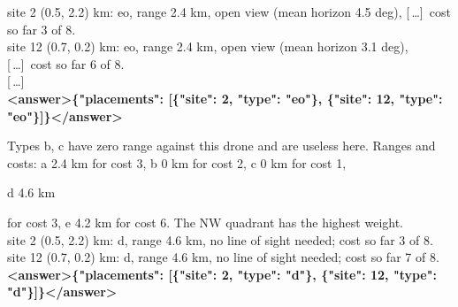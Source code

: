 \documentclass[border=1pt]{standalone}
\newcommand{\hl}[2]{{\setlength{\fboxsep}{0.6pt}\colorbox{#1}{\strut #2}}}
\newcommand{\om}{{\color{ob!70}[\,\dots]}}
\begin{document}
\begin{minipage}{7.16in}
\begin{minipage}[t]{0.492\linewidth}
\begin{tcolorbox}[colback=nm!4, colframe=nm, title={Trained 7B, names inventory \hfill QR = 0.44}]
site 2 (0.5, 2.2) km: eo, range 2.4 km, open view (mean horizon 4.5 deg), \om\ cost so far 3 of 8.\\
site 12 (0.7, 0.2) km: eo, range 2.4 km, open view (mean horizon 3.1 deg), \om\ cost so far 6 of 8.\\
\om\\[1pt]
{\color{nm}\textbf{<answer>\{"placements": [\{"site": 2, "type": "eo"\}, \{"site": 12, "type": "eo"\}]\}</answer>}}
\end{tcolorbox}\par\vspace{4pt}
\begin{tcolorbox}[colback=pr!4, colframe=pr, title={Trained 7B, properties inventory \hfill QR = 0.96}]
Types b, c have zero range against this drone and are useless here. Ranges and costs: a 2.4 km for cost 3, b 0 km for cost 2, c 0 km for cost 1, \hl{hlA}{d 4.6 km} for cost 3, e 4.2 km for cost 6. The NW quadrant has the highest weight.\\[1pt]
site 2 (0.5, 2.2) km: d, range 4.6 km, no line of sight needed; cost so far 3 of 8.\\
site 12 (0.7, 0.2) km: d, range 4.6 km, no line of sight needed; cost so far 7 of 8.\\[1pt]
{\color{pr}\textbf{<answer>\{"placements": [\{"site": 2, "type": "d"\}, \{"site": 12, "type": "d"\}]\}</answer>}}
\end{tcolorbox}
\end{minipage}
\end{minipage}
\end{document}
